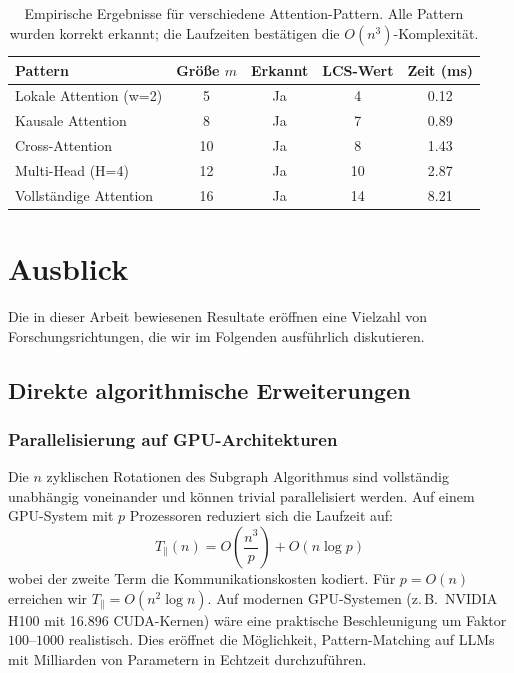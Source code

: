 ﻿\documentclass[a4paper,12pt]{article}
\theoremstyle{definition}
\begin{document}
\begin{table}[ht]
	\centering
	\begin{tabular}{lcccc}
		\toprule
		\textbf{Pattern} & \textbf{Größe $m$} & \textbf{Erkannt} & \textbf{LCS-Wert} & \textbf{Zeit (ms)} \\
		\midrule
		Lokale Attention (w=2) & 5 & Ja & 4 & 0.12 \\
		Kausale Attention & 8 & Ja & 7 & 0.89 \\
		Cross-Attention & 10 & Ja & 8 & 1.43 \\
		Multi-Head (H=4) & 12 & Ja & 10 & 2.87 \\
		Vollständige Attention & 16 & Ja & 14 & 8.21 \\
		\bottomrule
	\end{tabular}
	\caption{Empirische Ergebnisse für verschiedene Attention-Pattern.
	Alle Pattern wurden korrekt erkannt; die Laufzeiten bestätigen die
	$O(n^3)$-Komplexität.}
	\label{tab:ergebnisse}
\end{table}

\section{Ausblick}

Die in dieser Arbeit bewiesenen Resultate eröffnen eine Vielzahl von
Forschungsrichtungen, die wir im Folgenden ausführlich diskutieren.

\subsection{Direkte algorithmische Erweiterungen}

\subsubsection{Parallelisierung auf GPU-Architekturen}

Die $n$ zyklischen Rotationen des Subgraph Algorithmus sind vollständig
unabhängig voneinander und können trivial parallelisiert werden. Auf einem
GPU-System mit $p$ Prozessoren reduziert sich die Laufzeit auf:
\[
T_{\parallel}(n) = O\!\left(\frac{n^3}{p}\right) + O(n \log p)
\]
wobei der zweite Term die Kommunikationskosten kodiert. Für $p = O(n)$
erreichen wir $T_{\parallel} = O(n^2 \log n)$. Auf modernen GPU-Systemen
(z.\,B.\ NVIDIA H100 mit 16.896 CUDA-Kernen) wäre eine praktische
Beschleunigung um Faktor $100$--$1000$ realistisch. Dies eröffnet die
Möglichkeit, Pattern-Matching auf LLMs mit Milliarden von Parametern
in Echtzeit durchzuführen.
\end{document}
